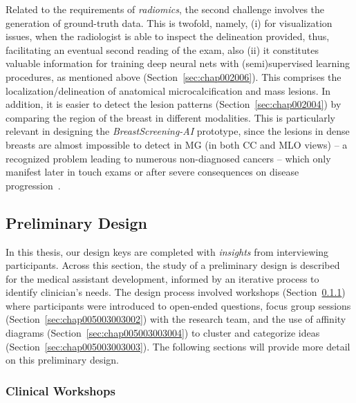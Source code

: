 Related to the requirements of {\it radiomics}, the second challenge involves the generation of ground-truth data.
This is twofold, namely,
(i) for visualization issues, when the radiologist is able to inspect the delineation provided, thus, facilitating an eventual second reading of the exam, also
(ii) it constitutes valuable information for training deep neural nets with (semi)supervised learning procedures, as mentioned above (Section~\ref{sec:chap002006}).
This comprises the localization/delineation of anatomical microcalcification and mass lesions.
In addition, it is easier to detect the lesion patterns (Section~\ref{sec:chap002004}) by comparing the region of the breast in different modalities.
This is particularly relevant in designing the {\it BreastScreening-AI} prototype, since the lesions in dense breasts are almost impossible to detect in \ac{MG} (in both \ac{CC} and \ac{MLO} views) -- a recognized problem leading to numerous non-diagnosed cancers -- which only manifest later in touch exams or after severe consequences on disease progression~\cite{mohamed2018deep}.

\subsection{Preliminary Design}
\label{sec:chap005003003}

In this thesis, our design keys are completed with {\it insights} from interviewing participants.
Across this section, the study of a preliminary design is described for the medical assistant development, informed by an iterative process to identify clinician's needs.
The design process involved workshops (Section~\ref{sec:chap005003003001}) where participants were introduced to open-ended questions, focus group sessions (Section~\ref{sec:chap005003003002}) with the research team, and the use of affinity diagrams (Section~\ref{sec:chap005003003004}) to cluster and categorize ideas (Section~\ref{sec:chap005003003003}).
The following sections will provide more detail on this preliminary design.

\subsubsection{Clinical Workshops}
\label{sec:chap005003003001}

